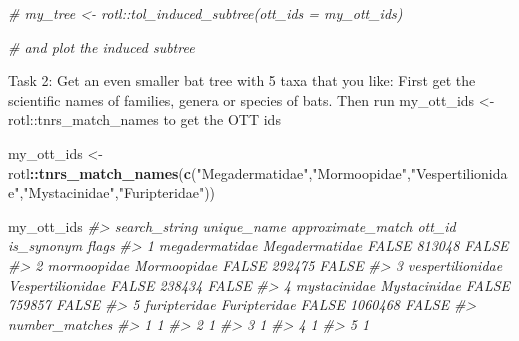 \documentclass[]{article}
\newenvironment{Shaded}{\begin{snugshade}}{\end{snugshade}}
\newcommand{\CommentTok}[1]{\textcolor[rgb]{0.56,0.35,0.01}{\textit{#1}}}
\newcommand{\KeywordTok}[1]{\textcolor[rgb]{0.13,0.29,0.53}{\textbf{#1}}}
\newcommand{\NormalTok}[1]{#1}
\newcommand{\OperatorTok}[1]{\textcolor[rgb]{0.81,0.36,0.00}{\textbf{#1}}}
\newcommand{\StringTok}[1]{\textcolor[rgb]{0.31,0.60,0.02}{#1}}
\begin{document}
\begin{Shaded}
\begin{Highlighting}[]
\CommentTok{# my_tree <- rotl::tol_induced_subtree(ott_ids = my_ott_ids)}

\CommentTok{# and plot the induced subtree}
\end{Highlighting}
\end{Shaded}

Task 2: Get an even smaller bat tree with 5 taxa that you like: First
get the scientific names of families, genera or species of bats. Then
run my\_ott\_ids \textless{}- rotl::tnrs\_match\_names to get the OTT
ids

\begin{Shaded}
\begin{Highlighting}[]
\NormalTok{my_ott_ids <-}\StringTok{ }\NormalTok{rotl}\OperatorTok{::}\KeywordTok{tnrs_match_names}\NormalTok{(}\KeywordTok{c}\NormalTok{(}\StringTok{"Megadermatidae"}\NormalTok{,}\StringTok{"Mormoopidae"}\NormalTok{,}\StringTok{"Vespertilionidae"}\NormalTok{,}\StringTok{"Mystacinidae"}\NormalTok{,}\StringTok{"Furipteridae"}\NormalTok{))}
\end{Highlighting}
\end{Shaded}

\begin{Shaded}
\begin{Highlighting}[]
\NormalTok{my_ott_ids}
\CommentTok{#>      search_string      unique_name approximate_match  ott_id is_synonym flags}
\CommentTok{#> 1   megadermatidae   Megadermatidae             FALSE  813048      FALSE      }
\CommentTok{#> 2      mormoopidae      Mormoopidae             FALSE  292475      FALSE      }
\CommentTok{#> 3 vespertilionidae Vespertilionidae             FALSE  238434      FALSE      }
\CommentTok{#> 4     mystacinidae     Mystacinidae             FALSE  759857      FALSE      }
\CommentTok{#> 5     furipteridae     Furipteridae             FALSE 1060468      FALSE      }
\CommentTok{#>   number_matches}
\CommentTok{#> 1              1}
\CommentTok{#> 2              1}
\CommentTok{#> 3              1}
\CommentTok{#> 4              1}
\CommentTok{#> 5              1}
\end{Highlighting}
\end{Shaded}

\begin{Shaded}
\end{Shaded}
\end{document}
